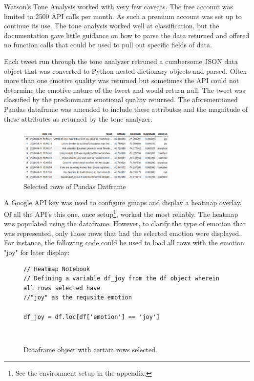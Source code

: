 \documentclass[12pt, oneside]{article}
\begin{document}
Watson's Tone Analysis worked with very few caveats. The free account was
limited to 2500 API calls per month. As such a premium account was set up to
continue its use. The tone analysis worked well at classification, but the
documentation gave little guidance on how to parse the data returned and
offered no function calls that could be used to pull out specific fields of
data.

Each tweet run through the tone analyzer retruned a cumbersome JSON data object
that was converted to Python nested dictionary objects and parsed. Often more
than one emotive quality was returned but sometimes the API could not determine
the emotive nature of the tweet and would return null. The tweet was classified
by the predominant emotional quality returned. The aforementioned Pandas
dataframe was amended to include these attributes and the magnitude of these
attributes as returned by the tone analyzer.

\begin{figure}[H]
\centering
\includegraphics[width=0.7\textwidth]{dataframe}
  \caption{Selected rows of Pandas Datframe}
\end{figure}

A Google API key was used to configure gmaps and display a heatmap overlay. Of
all the API's this one, once setup\footnote{See the environment setup in the
appendix.}, worked the most reliably. The heatmap was populated using the
dataframe. However, to clarify the type of emotion that was represented, only
those rows that had the selected emotion were displayed. For instance, the
following code could be used to load all rows with the emotion "joy" for later
display:
\begin{figure}[H]
\begin{lstlisting}
// Heatmap Notebook
// Defining a variable df_joy from the df object wherein all rows selected have
//"joy" as the requsite emotion

df_joy = df.loc[df['emotion'] == 'joy']
\end{lstlisting}
\caption{Dataframe object with certain rows selected.}\
\label{fig:code}
\end{figure}
\end{document}
